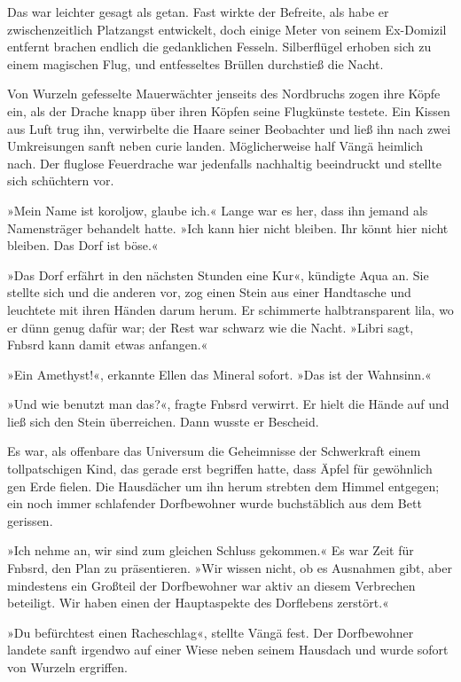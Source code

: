 Das war leichter gesagt als getan. Fast wirkte der Befreite, als habe er zwischenzeitlich Platzangst entwickelt, doch einige Meter von seinem Ex-Domizil entfernt brachen endlich die gedanklichen Fesseln. Silberflügel erhoben sich zu einem magischen Flug, und entfesseltes Brüllen durchstieß die Nacht.

Von Wurzeln gefesselte Mauerwächter jenseits des Nordbruchs zogen ihre Köpfe ein, als der Drache knapp über ihren Köpfen seine Flugkünste testete. Ein Kissen aus Luft trug ihn, verwirbelte die Haare seiner Beobachter und ließ ihn nach zwei Umkreisungen sanft neben curie landen. Möglicherweise half Vängä heimlich nach. Der fluglose Feuerdrache war jedenfalls nachhaltig beeindruckt und stellte sich schüchtern vor.

»Mein Name ist koroljow, glaube ich.« Lange war es her, dass ihn jemand als Namensträger behandelt hatte. »Ich kann hier nicht bleiben. Ihr könnt hier nicht bleiben. Das Dorf ist böse.«

»Das Dorf erfährt in den nächsten Stunden eine Kur«, kündigte Aqua an. Sie stellte sich und die anderen vor, zog einen Stein aus einer Handtasche und leuchtete mit ihren Händen darum herum. Er schimmerte halbtransparent lila, wo er dünn genug dafür war; der Rest war schwarz wie die Nacht. »Libri sagt, Fnbsrd kann damit etwas anfangen.«

»Ein Amethyst!«, erkannte Ellen das Mineral sofort. »Das ist der Wahnsinn.«

»Und wie benutzt man das?«, fragte Fnbsrd verwirrt. Er hielt die Hände auf und ließ sich den Stein überreichen. Dann wusste er Bescheid.

Es war, als offenbare das Universum die Geheimnisse der Schwerkraft einem tollpatschigen Kind, das gerade erst begriffen hatte, dass Äpfel für gewöhnlich gen Erde fielen. Die Hausdächer um ihn herum strebten dem Himmel entgegen; ein noch immer schlafender Dorfbewohner wurde buchstäblich aus dem Bett gerissen.

»Ich nehme an, wir sind zum gleichen Schluss gekommen.« Es war Zeit für Fnbsrd, den Plan zu präsentieren. »Wir wissen nicht, ob es Ausnahmen gibt, aber mindestens ein Großteil der Dorfbewohner war aktiv an diesem Verbrechen beteiligt. Wir haben einen der Hauptaspekte des Dorflebens zerstört.«

»Du befürchtest einen Racheschlag«, stellte Vängä fest. Der Dorfbewohner landete sanft irgendwo auf einer Wiese neben seinem Hausdach und wurde sofort von Wurzeln ergriffen.

